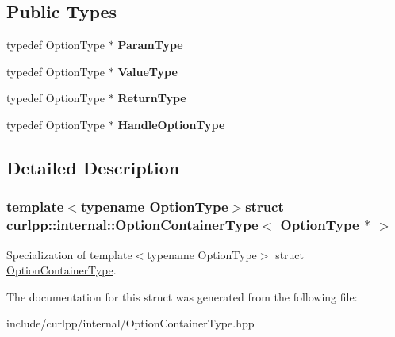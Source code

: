 \subsection*{Public Types}
\begin{DoxyCompactItemize}
\item 
\hypertarget{structcurlpp_1_1internal_1_1OptionContainerType_3_01OptionType_01_5_01_4_ad1a962856a2c61824668e892644123a6}{typedef Option\-Type $\ast$ {\bfseries Param\-Type}}\label{structcurlpp_1_1internal_1_1OptionContainerType_3_01OptionType_01_5_01_4_ad1a962856a2c61824668e892644123a6}

\item 
\hypertarget{structcurlpp_1_1internal_1_1OptionContainerType_3_01OptionType_01_5_01_4_ab07ea760e2182ba143bf20c2218beb25}{typedef Option\-Type $\ast$ {\bfseries Value\-Type}}\label{structcurlpp_1_1internal_1_1OptionContainerType_3_01OptionType_01_5_01_4_ab07ea760e2182ba143bf20c2218beb25}

\item 
\hypertarget{structcurlpp_1_1internal_1_1OptionContainerType_3_01OptionType_01_5_01_4_a327253649d473fbb604af8fd10001673}{typedef Option\-Type $\ast$ {\bfseries Return\-Type}}\label{structcurlpp_1_1internal_1_1OptionContainerType_3_01OptionType_01_5_01_4_a327253649d473fbb604af8fd10001673}

\item 
\hypertarget{structcurlpp_1_1internal_1_1OptionContainerType_3_01OptionType_01_5_01_4_a248c2a65f6841d5c029007ddd6e5230d}{typedef Option\-Type $\ast$ {\bfseries Handle\-Option\-Type}}\label{structcurlpp_1_1internal_1_1OptionContainerType_3_01OptionType_01_5_01_4_a248c2a65f6841d5c029007ddd6e5230d}

\end{DoxyCompactItemize}


\subsection{Detailed Description}
\subsubsection*{template$<$typename Option\-Type$>$struct curlpp\-::internal\-::\-Option\-Container\-Type$<$ Option\-Type $\ast$ $>$}

Specialization of template$<$typename Option\-Type$>$ struct \hyperlink{structcurlpp_1_1internal_1_1OptionContainerType}{Option\-Container\-Type}. 

The documentation for this struct was generated from the following file\-:\begin{DoxyCompactItemize}
\item 
include/curlpp/internal/Option\-Container\-Type.\-hpp\end{DoxyCompactItemize}
